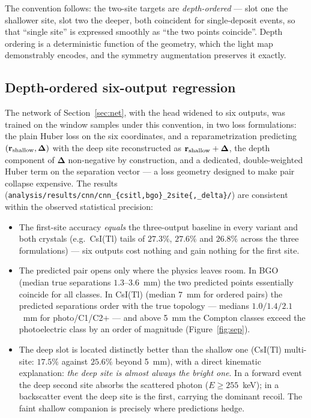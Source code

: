 \documentclass[11pt,a4paper]{article}
\newcommand{\code}[1]{\texttt{#1}}
\newcommand{\csitl}{CsI(Tl)}
\begin{document}
The convention follows: the two-site targets are \emph{depth-ordered} ---
slot one the shallower site, slot two the deeper, both coincident for
single-deposit events, so that ``single site'' is expressed smoothly as ``the
two points coincide''. Depth ordering is a deterministic function of the
geometry, which the light map demonstrably encodes, and the symmetry
augmentation preserves it exactly.

\subsection{Depth-ordered six-output regression}

The network of Section~\ref{sec:net}, with the head widened to six outputs,
was trained on the window samples under this convention, in two loss
formulations: the plain Huber loss on the six coordinates, and a
reparametrization predicting $(\mathbf{r}_{\rm shallow}, \boldsymbol{\Delta})$
with the deep site reconstructed as
$\mathbf{r}_{\rm shallow} + \boldsymbol{\Delta}$, the depth component of
$\boldsymbol{\Delta}$ non-negative by construction, and a dedicated,
double-weighted Huber term on the separation vector --- a loss geometry
designed to make pair collapse expensive. The results
(\code{analysis/results/cnn/cnn\_\{csitl,bgo\}\_2site\{,\_delta\}/}) are
consistent within the observed statistical precision:

\begin{itemize}
  \item The first-site accuracy \emph{equals} the three-output baseline in
    every variant and both crystals (e.g.\ \csitl{} tails of $27.3\%$,
    $27.6\%$ and $26.8\%$ across the three formulations) --- six outputs cost
    nothing and gain nothing for the first site.
  \item The predicted pair opens only where the physics leaves room. In BGO
    (median true separations $1.3$--$3.6$~mm) the two predicted points
    essentially coincide for all classes. In \csitl{} (median $7$~mm for
    ordered pairs) the predicted separations order with the true topology ---
    medians $1.0/1.4/2.1$~mm for photo/C1/C2$+$ --- and above 5~mm the
    Compton classes exceed the photoelectric class by an order of magnitude
    (Figure~\ref{fig:sep}).
  \item The deep slot is located distinctly better than the shallow one
    (\csitl{} multi-site: $17.5\%$ against $25.6\%$ beyond 5~mm), with a
    direct kinematic explanation: \emph{the deep site is almost always the bright
    one}. In a forward event the deep second site absorbs the scattered
    photon ($E \ge 255$~keV); in a backscatter event the deep site is the
    first, carrying the dominant recoil. The faint shallow companion is
    precisely where predictions hedge.
\end{itemize}
\end{document}
